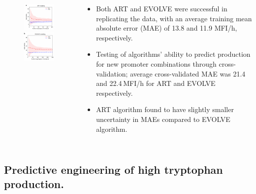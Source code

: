 \documentclass{beamer}
\begin{document}
\begin{frame}{}
		\begin{columns}
	    \begin{figure}
		\centering
		\includegraphics[width=3.3cm]{pic/图片17.pdf}
		\includegraphics[width=3cm]{pic/图片18.pdf}
 	    \end{figure}
    \begin{itemize} [<+-| alert@+>] %
        \item\scriptsize Both ART and EVOLVE were successful in replicating the data, with an average training mean absolute error (MAE) of 13.8 and 11.9 MFI/h, respectively.
        \item\scriptsize Testing of algorithms' ability to predict production for new promoter combinations through cross-validation; average cross-validated MAE was 21.4 and 22.4 MFI/h for ART and EVOLVE respectively.
        \item\scriptsize ART algorithm found to have slightly smaller uncertainty in MAEs compared to EVOLVE algorithm.
        
    \end{itemize}      
        \end{columns}

\end{frame}

\subsection{Predictive engineering of high tryptophan production.}
\end{document}
